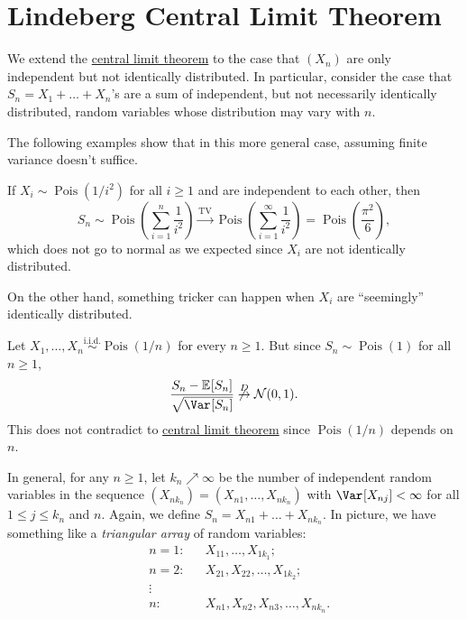 \chapter{Lindeberg Central Limit Theorem}
We extend the \hyperref[thm:CLT]{central limit theorem} to the case that \((X_n)\) are only independent but not identically distributed. In particular, consider the case that \(S_n = X_1 + \dots + X_n\)'s are a sum of independent, but not necessarily identically distributed, random variables whose distribution may vary with \(n\).

The following examples show that in this more general case, assuming finite variance doesn't suffice.

\begin{eg}
	If \(X_i \sim \operatorname{Pois}(1 / i^2) \) for all \(i \geq 1\) and are independent to each other, then
	\[
		S_n \sim \operatorname{Pois}\left( \sum_{i=1}^{n} \frac{1}{i^2} \right)
		\overset{\operatorname{TV} }{\to} \operatorname{Pois}\left( \sum_{i=1}^{\infty} \frac{1}{i^2} \right)
		= \operatorname{Pois}\left( \frac{\pi ^2}{6} \right) ,
	\]
	which does not go to normal as we expected since \(X_i\) are not identically distributed.
\end{eg}

On the other hand, something tricker can happen when \(X_i\) are ``seemingly'' identically distributed.

\begin{eg}\label{eg:Poisson-CLT-fail}
	Let \(X_1, \dots , X_n \overset{\text{i.i.d.} }{\sim } \operatorname{Pois}(1 / n) \) for every \(n \geq 1\). But since \(S_n \sim \operatorname{Pois}(1) \) for all \(n \geq 1\),
	\[
		\frac{S_n - \mathbb{E}_{}[S_n] }{\sqrt{\Var_{}[S_n] } }
		\not \overset{D}{\to} \mathcal{N} (0, 1).
	\]
	This does not contradict to \hyperref[thm:CLT]{central limit theorem} since \(\operatorname{Pois}(1 / n) \) depends on \(n\).
\end{eg}

In general, for any \(n \geq 1\), let \(k_n \nearrow \infty \) be the number of independent random variables in the sequence \((X_{n k_n}) = (X_{n1}, \dots , X_{n k_n})\) with \(\Var_{}[X_{nj}] < \infty \) for all \(1 \leq j \leq k_n\) and \(n\). Again, we define \(S_n = X_{n1} + \dots + X_{n k_n}\). In picture, we have something like a \emph{triangular array} of random variables:
\[
	\begin{aligned}
		 & n=1 \colon &  & X_{11} , \dots , X_{1 k_1};                 \\
		 & n=2 \colon &  & X_{21}, X_{22} , \dots , X_{1 k_2};         \\
		 & \vdots     &  &                                             \\
		 & n \colon   &  & X_{n1} , X_{n2}, X_{n3}, \dots , X_{n k_n}.
	\end{aligned}
\]

